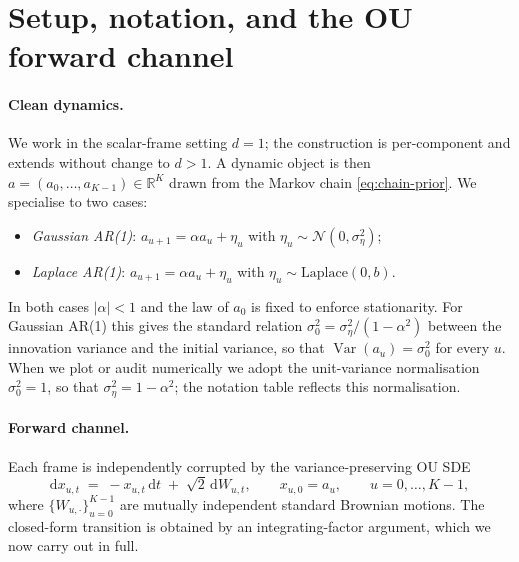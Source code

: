 \documentclass[11pt]{article}
\theoremstyle{definition}
\newcommand{\R}{\mathbb{R}}
\newcommand{\Var}{\operatorname{Var}}
\begin{document}
\section{Setup, notation, and the OU forward channel}\label{sec:setup}

\paragraph{Clean dynamics.} We work in the scalar-frame setting
\(d = 1\); the construction is per-component and extends without
change to \(d > 1\). A dynamic object is then
\(a = (a_0, \dots, a_{K-1}) \in \R^K\) drawn from the Markov chain
\eqref{eq:chain-prior}. We specialise to two cases:
\begin{itemize}[leftmargin=1.8em]
    \item \emph{Gaussian AR(1)}: \(a_{u+1} = \alpha a_u + \eta_u\) with
        \(\eta_u \sim \mathcal N(0, \sigma_\eta^2)\);
    \item \emph{Laplace AR(1)}: \(a_{u+1} = \alpha a_u + \eta_u\) with
        \(\eta_u \sim \mathrm{Laplace}(0, b)\).
\end{itemize}
In both cases \(|\alpha| < 1\) and the law of \(a_0\) is fixed to
enforce stationarity. For Gaussian AR(1) this gives the standard
relation
\(\sigma_0^2 = \sigma_\eta^2 / (1 - \alpha^2)\) between the
innovation variance and the initial variance, so that
\(\Var(a_u) = \sigma_0^2\) for every \(u\). When we plot or audit
numerically we adopt the unit-variance normalisation
\(\sigma_0^2 = 1\), so that \(\sigma_\eta^2 = 1 - \alpha^2\); the
notation table reflects this normalisation.

\paragraph{Forward channel.} Each frame is independently corrupted by the
variance-preserving OU SDE \citep{UhlenbeckOrnstein1930, Oksendal2003}
\begin{equation}\label{eq:ou-sde}
    \mathrm d x_{u,t}
    \;=\; -x_{u,t}\, \mathrm d t
    \;+\; \sqrt{2}\, \mathrm d W_{u,t},
    \qquad
    x_{u,0} = a_u,
    \qquad
    u = 0, \dots, K-1,
\end{equation}
where \(\{W_{u, \cdot}\}_{u=0}^{K-1}\) are mutually independent standard
Brownian motions. The closed-form transition is obtained by an
integrating-factor argument, which we now carry out in full.
\end{document}
